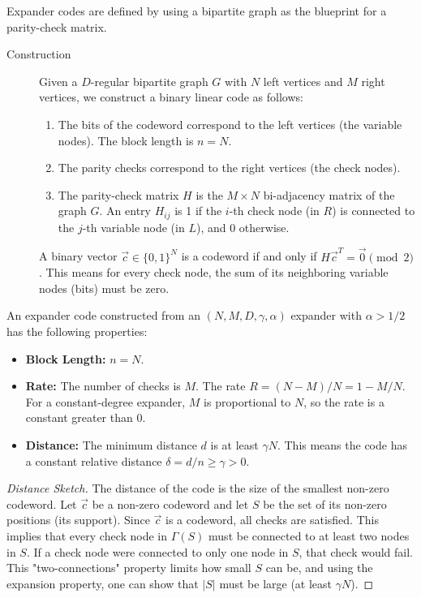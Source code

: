 Expander codes are defined by using a bipartite graph as the blueprint for a parity-check matrix.

\begin{description}
    \item[Construction] Given a $D$-regular bipartite graph $G$ with $N$ left vertices and $M$ right vertices, we construct a binary linear code as follows:
    \begin{enumerate}
        \item The bits of the codeword correspond to the left vertices (the variable nodes). The block length is $n=N$.
        \item The parity checks correspond to the right vertices (the check nodes).
        \item The parity-check matrix $H$ is the $M \times N$ bi-adjacency matrix of the graph $G$. An entry $H_{ij}$ is 1 if the $i$-th check node (in $R$) is connected to the $j$-th variable node (in $L$), and 0 otherwise.
    \end{enumerate}
    A binary vector $\vec{c} \in \{0,1\}^N$ is a codeword if and only if $H\vec{c}^T = \vec{0} \pmod{2}$. This means for every check node, the sum of its neighboring variable nodes (bits) must be zero.
\end{description}


\begin{theorem}
An expander code constructed from an $(N, M, D, \gamma, \alpha)$ expander with $\alpha > 1/2$ has the following properties:
\begin{itemize}
    \item \textbf{Block Length:} $n=N$.
    \item \textbf{Rate:} The number of checks is $M$. The rate $R = (N-M)/N = 1 - M/N$. For a constant-degree expander, $M$ is proportional to $N$, so the rate is a constant greater than 0.
    \item \textbf{Distance:} The minimum distance $d$ is at least $\gamma N$. This means the code has a constant relative distance $\delta = d/n \ge \gamma > 0$.
\end{itemize}
\end{theorem}
\begin{proof}[Distance Sketch]
The distance of the code is the size of the smallest non-zero codeword. Let $\vec{c}$ be a non-zero codeword and let $S$ be the set of its non-zero positions (its support). Since $\vec{c}$ is a codeword, all checks are satisfied. This implies that every check node in $\Gamma(S)$ must be connected to at least two nodes in $S$. If a check node were connected to only one node in $S$, that check would fail. This "two-connections" property limits how small $S$ can be, and using the expansion property, one can show that $|S|$ must be large (at least $\gamma N$).
\end{proof}

